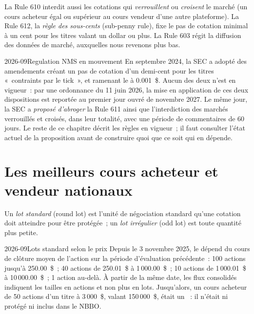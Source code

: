 La Rule 610 interdit aussi les cotations qui \emph{verrouillent} ou \emph{croisent} le marché
(un cours acheteur égal ou supérieur au cours vendeur d'une autre plateforme). La Rule 612, la
\emph{règle des sous-cents} (sub-penny rule), fixe le pas de cotation minimal à un cent pour
les titres valant un dollar ou plus. La Rule 603 régit la diffusion des données de marché,
auxquelles nous revenons plus bas.

\begin{dated}{2026-09}{Regulation NMS en mouvement}\label{dat:m1:us-equity-market-structure:nms}
En septembre 2024, la SEC a adopté des amendements créant un pas de cotation d'un demi-cent
pour les titres «~contraints par le tick~», et ramenant le  à
0.001~\$. Aucun des deux n'est en vigueur~: par une ordonnance du 11 juin 2026, la mise en
application de ces deux dispositions est reportée au premier jour ouvré de novembre 2027. Le même jour,
la SEC a \emph{proposé d'abroger} la Rule 611 ainsi que l'interdiction des marchés
verrouillés et croisés, dans leur totalité, avec une période de commentaires de 60 jours.
Le reste de ce chapitre décrit les règles en vigueur~; il faut consulter l'état actuel de la
proposition avant de construire quoi que ce soit qui en dépende.
\end{dated}

\section{Les meilleurs cours acheteur et vendeur nationaux}

\begin{definition}\label{def:m1:us-equity-market-structure:lots}
Un \emph{lot standard} (round lot) est l'unité de négociation standard qu'une
cotation doit atteindre pour être protégée~; un \emph{lot irrégulier} (odd lot) est
toute quantité plus petite.
\end{definition}

\begin{dated}{2026-09}{Lots standard selon le prix}\label{dat:m1:us-equity-market-structure:lots}
Depuis le 3 novembre 2025, le  dépend du cours de clôture moyen de l'action
sur la période d'évaluation précédente~: 100 actions jusqu'à 250.00~\$~; 40 actions de
250.01~\$ à 1\,000.00~\$~; 10 actions de 1\,000.01~\$ à
10\,000.00~\$~; 1 action au-delà. À partir de la même date, les flux consolidés
indiquent les tailles en actions et non plus en lots. Jusqu'alors, un cours acheteur de 50 actions
d'un titre à 3\,000~\$, valant 150\,000~\$, était un ~: il n'était ni protégé ni
inclus dans le NBBO.
\end{dated}

